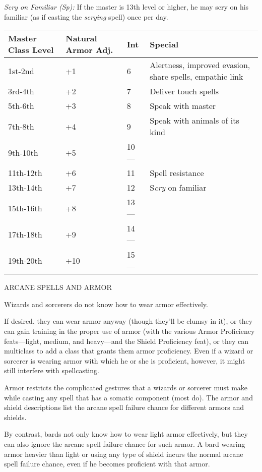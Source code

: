 \documentclass{article}
\begin{document}
\textit{Scry on Familiar (Sp): }If the master is 13th level or higher, he may scry 
on his familiar (as if casting the \textit{scrying }spell) once per day.

\vspace{12pt}
\begin{tabular}{|>{\raggedright}p{63pt}|>{\raggedright}p{65pt}|>{\raggedright}p{13pt}|>{\raggedright}p{160pt}|}
\hline
M\textbf{aster Class Level } & N\textbf{atural Armor Adj. } & I\textbf{nt } & S\textbf{pecial}\tabularnewline
\hline
1st-2nd  & +1  & 6  & Alertness, improved evasion, share spells, empathic link\tabularnewline
\hline
3rd-4th  & +2  & 7  & Deliver touch spells\tabularnewline
\hline
5th-6th  & +3  & 8  & Speak with master\tabularnewline
\hline
7th-8th  & +4  & 9  & Speak with animals of its kind\tabularnewline
\hline
9th-10th  & +5  & 10 --- & \tabularnewline
\hline
11th-12th  & +6  & 11  & Spell resistance\tabularnewline
\hline
13th-14th  & +7  & 12  & S\textit{cry }on familiar\tabularnewline
\hline
15th-16th  & +8  & 13 --- & \tabularnewline
\hline
17th-18th  & +9  & 14 --- & \tabularnewline
\hline
19th-20th  & +10  & 15 --- & \tabularnewline
\hline
\end{tabular}

\vspace{12pt}
ARCANE SPELLS AND ARMOR

Wizards and sorcerers do not know how to wear armor effectively.

If desired, they can wear armor anyway (though they'll be clumsy in it), or they 
can gain training in the proper use of armor (with the various Armor Proficiency 
feats---light, medium, and heavy---and the Shield Proficiency feat), or they can 
multiclass to add a class that grants them armor proficiency. Even if a wizard 
or sorcerer is wearing armor with which he or she is proficient, however, it might 
still interfere with spellcasting.

Armor restricts the complicated gestures that a wizards or sorcerer must make while 
casting any spell that has a somatic component (most do). The armor and shield 
descriptions list the arcane spell failure chance for different armors and shields.

By contrast, bards not only know how to wear light armor effectively, but they 
can also ignore the arcane spell failure chance for such armor. A bard wearing 
armor heavier than light or using any type of shield incurs the normal arcane spell 
failure chance, even if he becomes proficient with that armor.
\end{document}
